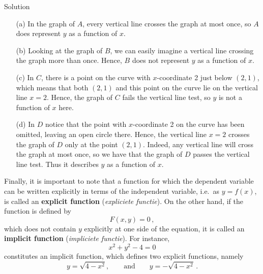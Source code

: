 \begin{example}
\begin{figure}[H]
\end{figure}

Solution 

\begin{enumerate}
\item [(a)]   In the graph of $A$, every vertical line crosses the graph at most once, so $A$ does represent $y$ as a function of $x$.
\item [(b)] Looking at the graph of $B$, we can easily imagine a vertical line crossing the graph more than once.  Hence, $B$ does not represent $y$ as a function of $x$.  
\item [(c)]  In $C$, there is a point on the curve with $x$-coordinate 2 just below $(2,1)$, which means that both $(2,1)$ and this point on the curve lie on the vertical line $x=2$.  Hence, the graph of  $C$ fails the vertical line test, so $y$ is not a function of $x$ here. 
\item [(d)] In $D$ notice that the point with $x$-coordinate 2 on the curve has been omitted, leaving an open circle there.  Hence, the vertical line $x=2$ crosses the graph of $D$ only at the point $(2,1)$.  Indeed, any vertical line will cross the graph at most once, so we have that the graph of $D$ passes the vertical line test.  Thus it describes $y$ as a function of $x$.
\end{enumerate}
\end{example}

Finally, it is important to note that a function for which the dependent variable can be written explicitly in terms of the independent variable, i.e.\ as $y=f(x)$, is called an \textbf{explicit function} (\textit{expliciete functie}). On the other hand, if the function is defined by
$$
F(x,y)=0\,,
$$
which does not contain $y$ explicitly at one side of the equation, it is called an \textbf{implicit function} (\textit{impli\-ciete functie}). For instance, 
$$
x^2+y^2-4=0
$$
constitutes an implicit function, which defines two explicit functions, namely
$$
y=\sqrt{4-x^2},\qquad\mbox{and} \qquad y=-\sqrt{4-x^2}\,.
$$

